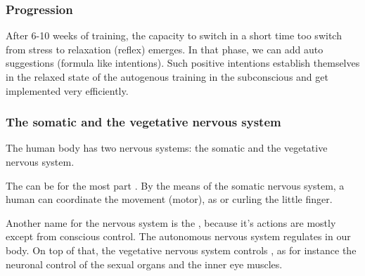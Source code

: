 \begin{frame}
\frametitle{Progression}


After 6-10 weeks of training, the capacity to switch in a short time too switch from stress to relaxation (reflex) emerges. In that phase, we can add auto suggestions (formula like intentions). Such positive intentions establish themselves in the relaxed state of the autogenous training in the subconscious and get implemented very efficiently.


\end{frame}


\begin{frame}
\frametitle{The somatic and the vegetative nervous system}


The human body has two nervous systems: the somatic and the vegetative nervous system.

The  can be for the most part . By the means of the somatic nervous system, a human can coordinate the movement (motor), as  or curling the little finger.

Another name for the  nervous system is the , because it's actions are mostly except from conscious control. The autonomous nervous system regulates  in our body. 
On top of that, the vegetative nervous system controls , as for instance the neuronal control of the sexual organs and the inner eye muscles.


\end{frame}

